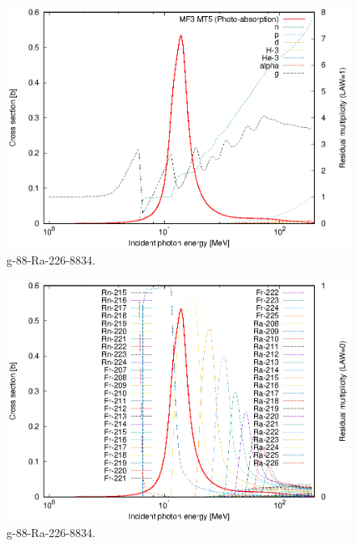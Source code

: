 \begin{figure}
 \includegraphics[width=\linewidth]{eps/g_88-Ra-226_8834.eps}
  \caption{g-88-Ra-226-8834.}
\end{figure}
\begin{figure}
 \includegraphics[width=\linewidth]{eps-law0/g_88-Ra-226_8834.eps}
 \caption{g-88-Ra-226-8834.}
\end{figure}
\newpage \clearpage

